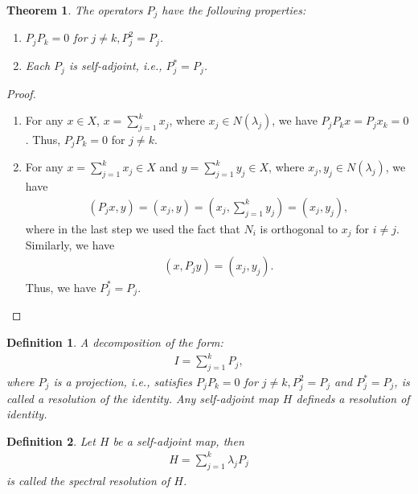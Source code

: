 \documentclass[10pt]{book}
\newtheorem{definition}{Definition}[chapter]
\newtheorem{theorem}{Theorem}[chapter]
\theoremstyle{definition}
\numberwithin{equation}{chapter}
\begin{document}
\begin{theorem}
The operators $P_j$ have the following properties:
\begin{enumerate}[label=(\alph*)]
    \item $P_j P_k = 0$ for $j\neq k, P_j^2 = P_j$.
    \item Each $P_j$ is self-adjoint, i.e., $P_j^* = P_j$.
\end{enumerate}
\end{theorem}
\begin{proof}
~\begin{enumerate}[label=(\alph*)]
    \item For any $x\in X$, $x = \sum^k_{j=1}x_j$, where $x_j\in N(\lambda_j)$, we have $P_j P_k x = P_j x_k = 0$. Thus, $P_j P_k = 0$ for $j\neq k$.
    \item For any $x = \sum^k_{j=1}x_j \in X$ and $y = \sum^k_{j=1}y_j \in X$, where $x_j, y_j \in N(\lambda_j)$, we have
    \begin{align*}
        \left(P_j x, y\right) = \left(x_j, y\right) = \left(x_j, \sum^k_{j=1}y_j\right) = \left(x_j, y_j\right),
    \end{align*}
    where in the last step we used the fact that $N_i$ is orthogonal to $x_j$ for $i\neq j$. Similarly, we have
    \begin{align*}
        \left(x, P_j y\right) = \left(x_j, y_j\right).
    \end{align*}
    Thus, we have $P_j^* = P_j$.
\end{enumerate}
\end{proof}

\medskip

\begin{definition}
A decomposition of the form:
\begin{align*}
    I = \sum^k_{j=1} P_j,
\end{align*}
where $P_j$ is a projection, i.e., satisfies $P_j P_k = 0$ for $j\neq k, P_j^2 = P_j$ and $P_j^* = P_j$, is called a resolution of the identity. Any self-adjoint map $H$ defineds a resolution of identity.
\end{definition}

\medskip

\begin{definition}
Let $H$ be a self-adjoint map, then 
\begin{align*}
    H = \sum^k_{j=1} \lambda_j P_j
\end{align*}
is called the spectral resolution of $H$.
\end{definition}
\end{document}
